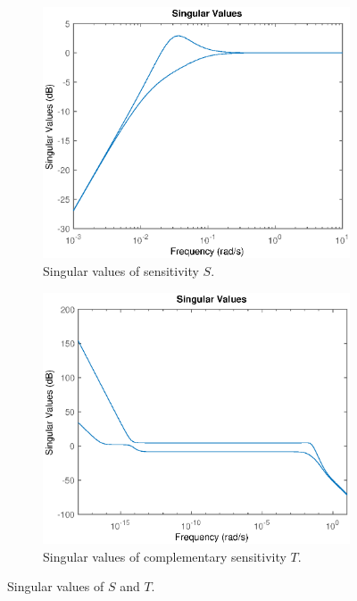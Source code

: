 \documentclass[11pt,a4paper]{article}
\begin{document}
\begin{figure}[!ht]
	\footnotesize
	\centering 
	\begin{subfigure}[t]{.495\linewidth}
		\includegraphics[width=\columnwidth]{3321}
		\caption{Singular values of sensitivity $S$.}
		\label{fig:3321}
	\end{subfigure}
	\begin{subfigure}[t]{.495\linewidth}
		\includegraphics[width=\columnwidth]{3322}
		\caption{Singular values of complementary sensitivity $T$.}
		\label{fig:3322}
	\end{subfigure}
	\caption{Singular values of $S$ and $T$.}
	\label{fig:NMPSingular}
\end{figure}
\end{document}
